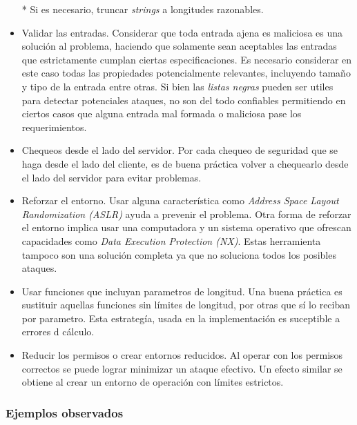 \begin{itemize}
	* Si es necesario, truncar \textit{strings} a longitudes razonables.
    \item Validar las entradas.
	Considerar que toda entrada ajena es maliciosa es una solución al problema, haciendo que solamente sean aceptables las entradas que estrictamente cumplan ciertas especificaciones.
	Es necesario considerar en este caso todas las propiedades potencialmente relevantes, incluyendo tamaño y tipo de la entrada entre otras.
	Si bien las \textit{listas negras} pueden ser utiles para detectar potenciales ataques, no son del todo confiables permitiendo en ciertos casos que alguna entrada mal formada o maliciosa 
	pase los requerimientos.
    \item Chequeos desde el lado del servidor. Por cada chequeo de seguridad que se haga desde el lado del cliente, es de buena práctica volver a chequearlo desde el lado del servidor para 
	evitar problemas.
    \item Reforzar el entorno. Usar alguna característica como \textit{Address Space Layout Randomization (ASLR)} ayuda a prevenir el problema. 
	Otra forma de reforzar el entorno implica usar una computadora y un sistema operativo que ofrescan capacidades como \textit{Data Execution Protection (NX)}.
	Estas herramienta tampoco son una solución completa ya que no soluciona todos los posibles ataques.
    \item Usar funciones que incluyan parametros de longitud. Una buena práctica es sustituir aquellas funciones sin límites de longitud, por otras que sí lo reciban por parametro.
	Esta estrategía, usada en la implementación es suceptible a errores d cálculo.
    \item Reducir los permisos o crear entornos reducidos. Al operar con los permisos correctos se puede lograr minimizar un ataque efectivo. Un efecto similar se obtiene al crear un 
	entorno de operación con límites estrictos.
\end{itemize}

\subsubsection{Ejemplos observados}

